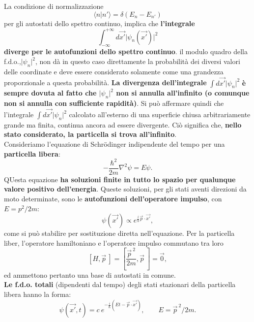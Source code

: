 La condizione di normalizzazione
\begin{equation}
\langle n \vert n' \rangle = \delta (E_n - E_{n'})
\end{equation}
per gli autostati dello spettro continuo, implica che \textbf{l'integrale}
\begin{equation}
\int _{- \infty} ^{+\infty} d\vec{x'} \vert \psi _n (\vec{x'}) \vert ^2
\end{equation}
\textbf{diverge per le autofunzioni dello spettro continuo}.
il modulo quadro della f.d.o.,$\vert \psi _n \vert ^2 $, non dà in questo caso direttamente la probabilità dei diversi valori delle coordinate e deve essere considerato solamente come una grandezza proporzionale a questa probabilità. \textbf{La divergenza dell'integrale} $ \int  d\vec{x'} \vert \psi _n  \vert ^2$ \textbf{è sempre dovuta al fatto che $\vert \psi _n  \vert ^2$ non si annulla all'infinito (o comunque non si annulla con sufficiente rapidità)}. Si può affermare quindi che l'integrale $ \int  d\vec{x'} \vert \psi _n  \vert ^2$ calcolato all'esterno di una superficie chiusa arbitrariamente grande ma finita, continua ancora ad essere divergente. Ciò significa che, \textbf{nello stato considerato, la particella si trova all'infinito}.\\
Consideriamo l'equazione di Schr\"{o}dinger indipendente del tempo per una \textbf{particella libera}:
\begin{equation}
-\frac{\hbar ^2}{2m}\nabla ^2 \psi = E\psi.
\end{equation}
QUesta equazione \textbf{ha soluzioni finite in tutto lo spazio per qualunque valore positivo dell'energia}. Queste soluzioni, per gli stati aventi direzioni da moto determinate, sono le \textbf{autofunzioni dell'operatore impulso}, con $E= p^2/2m$:
\begin{equation}
\psi (\vec{x'}) \propto e ^{\frac{i}{\hbar}\vec{p}\cdot \vec{x'}},
\end{equation}
come si può stabilire per sostituzione diretta nell'equazione. Per la particella liber, l'operatore hamiltoniano e l'operatore impulso commutano tra loro
\begin{equation}
\left[ H, \vec{p}\ \right] = \left[ \frac{ {\vec{p}}^{\ 2}}{2m}, \vec{p}\ \right] =\vec{0},
\end{equation}
ed ammettono pertanto una base di autostati in comune.\\
\textbf{Le f.d.o. totali} (dipendenti dal tempo) degli stati stazionari della particella libera hanno la forma:
\begin{equation}
\psi (\vec{x'}, t) = c\ e^{-\frac{i}{\hbar} (Et - \vec{p}\cdot \vec{x'})}, \qquad E={\vec{p}}^{\ 2}/{2m}.
\label{eq:cap8_6}
\end{equation}
